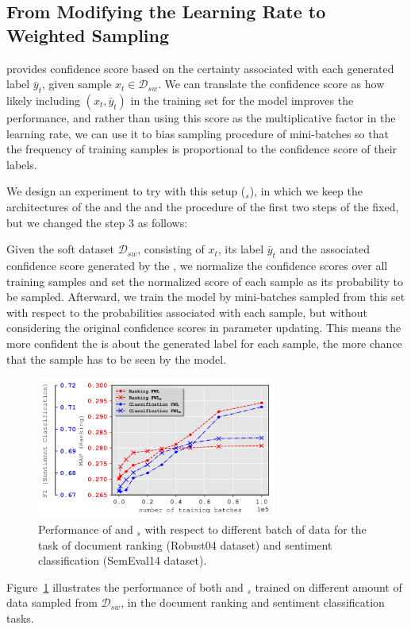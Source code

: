 \subsection{From Modifying the Learning Rate to Weighted Sampling}
\fwl provides confidence score based on the certainty associated with each generated label $\bar{y}_t$, given sample $x_t \in \mathcal{D}_{sw}$. We can translate the confidence score as how likely including $(x_t,\bar{y}_t)$ in the training set for the \std model improves the performance, and rather than using this score as the multiplicative factor in the learning rate, we can use it to bias sampling procedure of mini-batches so that the frequency of training samples is proportional to the confidence score of their labels.

We design an experiment to try \fwl with this setup (\fwlnospace$_s$), in which we keep the architectures of the \std and the \tch and the procedure of the  first two steps of the \fwl fixed, but we changed the step 3 as follows:

Given the soft dataset $\mathcal{D}_{sw}$, consisting of $x_t$, its label $\bar{y}_t$ and the associated confidence score generated by the \tch, we normalize the confidence scores over all training samples and set the normalized score of each sample as its probability to be sampled. 
Afterward, we train the \std model by mini-batches sampled from this set with respect to the probabilities associated with each sample, but without considering the original confidence scores in parameter updating.
This means the more confident the \tch is about the generated label for each sample, the more chance that the sample has to be seen by the \std model.
\begin{figure}[t]
    \centering
    \includegraphics[width=0.7\textwidth]{03-part-02/chapter-05/figs_and_tables/plot_sampling_fwl.png}
    \caption{Performance of \fwl and \fwlnospace$_s$ with respect to different batch of data for the task of document ranking (Robust04 dataset) and sentiment classification (SemEval14 dataset).}
    \label{fig:sampling}
\end{figure}
Figure~\ref{fig:sampling} illustrates the performance of both \fwl and \fwlnospace$_s$ trained on different amount of data sampled from $\mathcal{D}_{sw}$, in the document ranking and sentiment classification tasks. 

